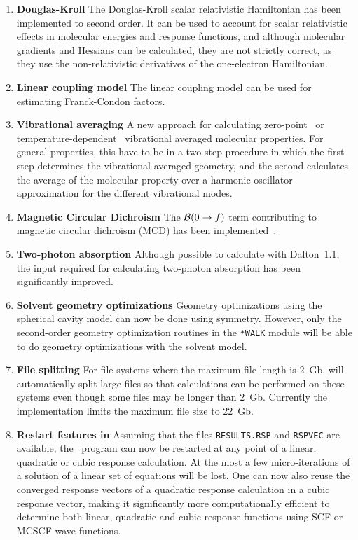 \begin{enumerate}
\item {\bf Douglas-Kroll} The Douglas-Kroll scalar relativistic Hamiltonian
has been implemented to second order. It can be used to account for
scalar relativistic effects in molecular energies and response
functions, and although molecular gradients and Hessians can be
calculated, they are not strictly correct, as they use the
non-relativistic derivatives of the one-electron Hamiltonian.

\item {\bf Linear coupling model} The linear coupling model can be used for
estimating Franck-Condon factors.

\item  {\bf Vibrational averaging} A new approach for calculating
zero-point~\cite{poakrprtjcp112,krpoaprtjcp112} or
tem\-pera\-ture-dependent~\cite{krjljv} vibrational averaged molecular 
properties. For general properties, this have to be in a two-step
procedure in which the first step determines the vibrational averaged
geometry, and the second calculates the average of the molecular
property over a harmonic oscillator approximation for the different
vibrational modes. 

\item {\bf Magnetic Circular Dichroism} The ${\cal{B}}(0\rightarrow f)$ term 
contributing to
magnetic circular dichroism (MCD) has been
implemented~\cite{Coriani:MCDRSP}. 

\item {\bf Two-photon absorption} Although possible to calculate with
Dalton~1.1, the input required for calculating two-photon absorption
has been significantly improved.

\item{\bf Solvent geometry optimizations} Geometry optimizations using
the spherical cavity model can now be done using symmetry. However,
only the second-order geometry optimization routines in the
\verb|*WALK| module will be able to do geometry optimizations with the
solvent model.

\item {\bf File splitting} For file systems where the maximum file length is
2~Gb, {\dalton} will automatically split large files  so that
calculations can be performed on these systems even though some files
may be longer than 2~Gb. Currently the implementation limits the
maximum file size to 22~Gb.

\item {\bf Restart features in \resp } Assuming that the files
\verb|RESULTS.RSP| and \verb|RSPVEC| are available, the \resp\ program
can now be restarted at any point of a linear, quadratic or cubic
response calculation. At the most a few micro-iterations of a solution
of a linear set of equations will be lost. One can now also reuse the
converged response vectors of a quadratic response calculation in a
cubic response vector, making it significantly more computationally
efficient to determine both linear, quadratic and cubic response
functions using SCF or MCSCF wave functions.
\end{enumerate}
